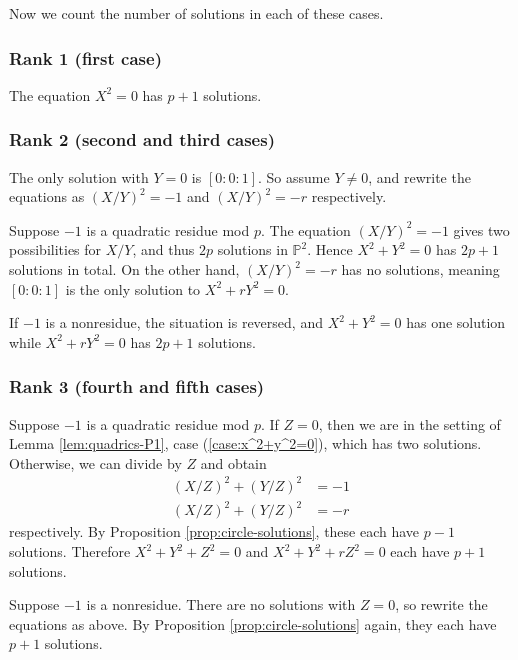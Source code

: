 \documentclass[10pt,a5paper]{amsart}
\numberwithin{equation}{section}
\numberwithin{figure}{section}
\theoremstyle{definition}
\theoremstyle{remark}
\theoremstyle{plain}
\theoremstyle{plain}
\theoremstyle{definition}
\theoremstyle{plain}
\theoremstyle{plain}
\begin{document}
Now we count the number of solutions in each of these cases.
\subsubsection*{Rank 1 (first case)}
The equation $X^2 = 0$ has $p + 1$ solutions.

\subsubsection*{Rank 2 (second and third cases)}
The only solution with $Y=0$ is $[0:0:1]$. So assume $Y \neq 0$, and rewrite the equations as $(X/Y)^2 = -1$ and $(X/Y)^2 = -r$ respectively.

Suppose $-1$ is a quadratic residue mod $p$. The equation $(X/Y)^2 = -1$ gives two possibilities for $X/Y$, and thus $2p$ solutions in $\mathbb{P}^2$. Hence $X^2 + Y^2 = 0$ has $2p + 1$ solutions in total. On the other hand, $(X/Y)^2 = -r$ has no solutions, meaning $[0:0:1]$ is the only solution to $X^2 + rY^2 = 0$.

If $-1$ is a nonresidue, the situation is reversed, and $X^2 + Y^2 = 0$ has one solution while $X^2 + rY^2 = 0$ has $2p + 1$ solutions.

\subsubsection*{Rank 3 (fourth and fifth cases)}
Suppose $-1$ is a quadratic residue mod $p$. If $Z = 0$, then we are in the setting of Lemma \ref{lem:quadrics-P1}, case (\ref{case:x^2+y^2=0}), which has two solutions. Otherwise, we can divide by $Z$ and obtain
\begin{align*}
	(X/Z)^2 + (Y/Z)^2 &= -1\\
	(X/Z)^2 + (Y/Z)^2 &= -r
\end{align*}
respectively. By Proposition \ref{prop:circle-solutions}, these each have $p - 1$ solutions. Therefore $X^2 + Y^2 + Z^2 = 0$ and $X^2 + Y^2 + rZ^2 = 0$ each have $p+1$ solutions.

Suppose $-1$ is a nonresidue. There are no solutions with $Z=0$, so rewrite the equations as above. By Proposition \ref{prop:circle-solutions} again, they each have $p + 1$ solutions.

\appendix
\end{document}
